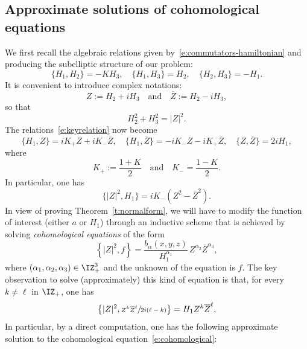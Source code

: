 \documentclass[10pt]{amsart}
\theoremstyle{plain}
\theoremstyle{definition}
\theoremstyle{remark}
\begin{document}
\subsection{Approximate solutions of cohomological equations}

We first recall the alge\-braic relations given by~\eqref{e:commutators-hamiltonian} and producing the subelliptic structure of our problem:
\begin{equation}\label{e:keyrelation}
\{H_1,H_{2}\}=-KH_3,\quad \{H_1, H_3\}=H_{2},\quad\{H_2,H_3\}=-H_1.
\end{equation}
It is convenient to introduce complex notations:
\[
Z:=H_{2}+iH_3\quad\text{and}\quad \overline{Z}:=H_{2}-iH_3,
\]
so that
\[
H_{2}^2+H_3^2=|Z|^2.
\]
The relations~\eqref{e:keyrelation} now become
\begin{equation}%
\{H_1,Z\}=iK_+Z+iK_-\overline{Z},\quad \{H_1, \overline{Z}\}=-iK_-Z-iK_+\overline{Z},\quad\{Z,\overline{Z}\}=2iH_1,
\end{equation}
where
\[
K_+:=\frac{1+K}{2}\quad\text{and}\quad K_-=\frac{1-K}{2}.
\]
In particular, one has
\begin{equation}\label{e:H1commuteZ2}
\{|Z|^2,H_1\}=iK_-(Z^2-\overline{Z}^2).
\end{equation}
In view of proving Theorem~\ref{t:normalform}, we will have to modify the function of interest (either $a$ or $H_1$) through an inductive scheme that is achieved by solving \emph{cohomological equations} of the form
\begin{equation}\label{e:cohomological}
\left\{|Z|^2,f\right\}=\frac{b_\alpha(x,y,z)}{H_1^{\alpha_1}}\,Z^{\alpha_2}\overline{Z}^{\alpha_3},
\end{equation}
where $(\alpha_1,\alpha_2,\alpha_3)\in\IZ_+^3$ and the unknown of the equation is $f$. The key observation to solve (approximately) this kind of equation is that, for every $k\neq \ell$ in $\IZ_+$, one has
\begin{equation}\label{e:solution-cohomological-function}
\left\{|Z|^2, \sfrac{Z^k \overline{Z}^\ell}{2i(\ell-k)}\right\}=H_1 Z^k \overline{Z}^\ell.
\end{equation}
In particular, by a direct computation, one has the following approximate solution to the cohomological equation~\eqref{e:cohomological}:
\end{document}
